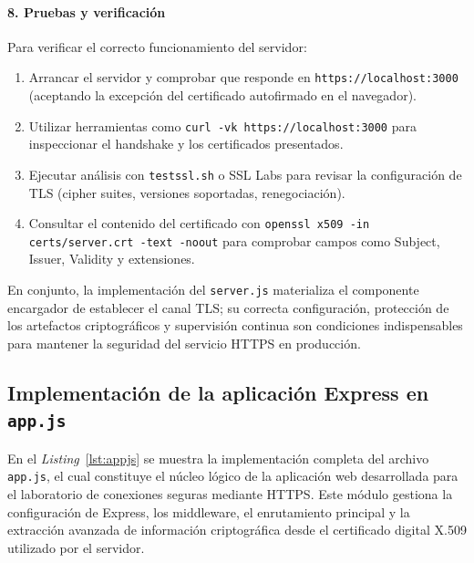 \paragraph{8. Pruebas y verificación}
Para verificar el correcto funcionamiento del servidor:
\begin{enumerate}
  \item Arrancar el servidor y comprobar que responde en \texttt{https://localhost:3000} (aceptando la excepción del certificado autofirmado en el navegador).
  \item Utilizar herramientas como \texttt{curl -vk https://localhost:3000} para inspeccionar el handshake y los certificados presentados.
  \item Ejecutar análisis con \texttt{testssl.sh} o SSL Labs para revisar la configuración de TLS (cipher suites, versiones soportadas, renegociación).
  \item Consultar el contenido del certificado con \texttt{openssl x509 -in certs/server.crt -text -noout} para comprobar campos como Subject, Issuer, Validity y extensiones.
\end{enumerate}

\noindent En conjunto, la implementación del \texttt{server.js} materializa el componente encargador de establecer el canal TLS; su correcta configuración, protección de los artefactos criptográficos y supervisión continua son condiciones indispensables para mantener la seguridad del servicio HTTPS en producción.



\subsection{Implementación de la aplicación Express en \texttt{app.js}}
\label{subsec:appjs}

En el \textit{Listing}~\ref{lst:appjs} se muestra la implementación completa del archivo \texttt{app.js}, el cual constituye el núcleo lógico de la aplicación web desarrollada para el laboratorio de conexiones seguras mediante HTTPS. Este módulo gestiona la configuración de Express, los middleware, el enrutamiento principal y la extracción avanzada de información criptográfica desde el certificado digital X.509 utilizado por el servidor.

